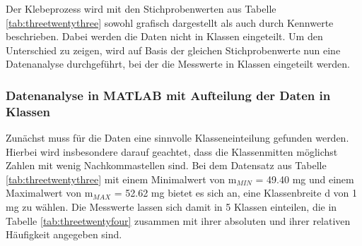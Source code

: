 

\noindent Der Klebeprozess wird mit den Stichprobenwerten aus Tabelle \ref{tab:threetwentythree} sowohl grafisch dargestellt als auch durch Kennwerte beschrieben. Dabei werden die Daten nicht in Klassen eingeteilt. Um den Unterschied zu zeigen, wird auf Basis der gleichen Stichprobenwerte nun eine Datenanalyse durchgef\"{u}hrt, bei der die Messwerte in Klassen eingeteilt werden.


\subsubsection{Datenanalyse in MATLAB mit Aufteilung der Daten in Klassen}

\noindent Zun\"{a}chst muss f\"{u}r die Daten eine sinnvolle Klasseneinteilung gefunden werden. Hierbei wird insbesondere darauf geachtet, dass die Klassenmitten m\"{o}glichst Zahlen mit wenig Nachkommastellen sind. Bei dem Datensatz aus Tabelle \ref{tab:threetwentythree} mit einem Minimalwert von m$_{MIN}$ = 49.40 mg und einem Maximalwert von m$_{MAX}$ = 52.62 mg bietet es sich an, eine Klassenbreite d von 1 mg zu w\"{a}hlen. Die Messwerte lassen sich damit in 5 Klassen einteilen, die in Tabelle \ref{tab:threetwentyfour} zusammen mit ihrer absoluten und ihrer relativen H\"{a}ufigkeit angegeben sind.

\clearpage

